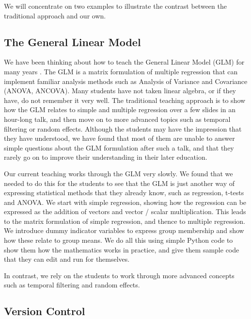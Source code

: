 We will concentrate on two examples to illustrate the contrast between the
traditional approach and our own.

\subsection{The General Linear Model}

We have been thinking about how to teach the General Linear Model (GLM) for
many years \citep{spm-statistics-orig,introducing-the-glm,poline2012general}.
The GLM is a matrix formulation of multiple regression that can implement
familiar analysis methods such as Analysis of Variance and Covariance (ANOVA,
ANCOVA).  Many students have not taken linear algebra, or if they have, do not
remember it very well.  The traditional teaching approach is to show how the
GLM relates to simple and multiple regression over a few slides in an
hour-long talk, and then move on to more advanced topics such as temporal
filtering or random effects.  Although the students may have the impression
that they have understood, we have found that most of them are unable to
answer simple questions about the GLM formulation after such a talk, and that
they rarely go on to improve their understanding in their later education.

Our current teaching works through the GLM very slowly. We found that we
needed to do this for the students to see that the GLM is just another way of
expressing statistical methods that they already know, such as regression,
t-tests and ANOVA.  We start with simple regression, showing how the
regression can be expressed as the addition of vectors and vector / scalar
multiplication.  This leads to the matrix formulation of simple regression,
and thence to multiple regression.  We introduce dummy indicator variables to
express group membership and show how these relate to group means.  We do all
this using simple Python code to show them how the mathematics works in
practice, and give them sample code that they can edit and run for themselves.

In contrast, we rely on the students to work through more advanced concepts
such as temporal filtering and random effects.

\subsection{Version Control}


